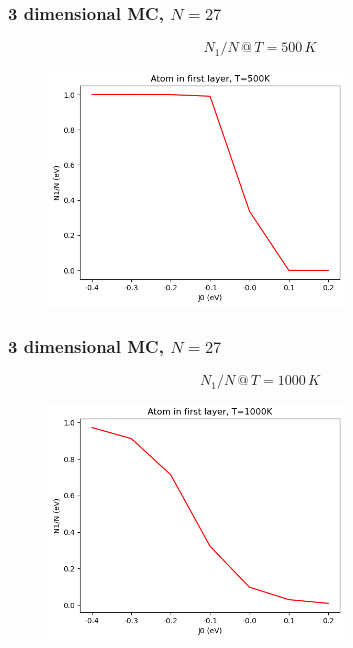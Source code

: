\documentclass{beamer}
\begin{document}
\begin{frame}
    \frametitle{3 dimensional MC, $N=27$}

    $$N_1/N\,@\, T=500\,K$$

    \begin{figure}
        \includegraphics[width=0.7\textwidth]{images/dratio500K.png}
    \end{figure}

\end{frame}

\begin{frame}
    \frametitle{3 dimensional MC, $N=27$}

    $$N_1/N \,@\, T=1000\,K$$

    \begin{figure}
        \includegraphics[width=0.7\textwidth]{images/dratio1000K.png}
    \end{figure}

\end{frame}
\end{document}
